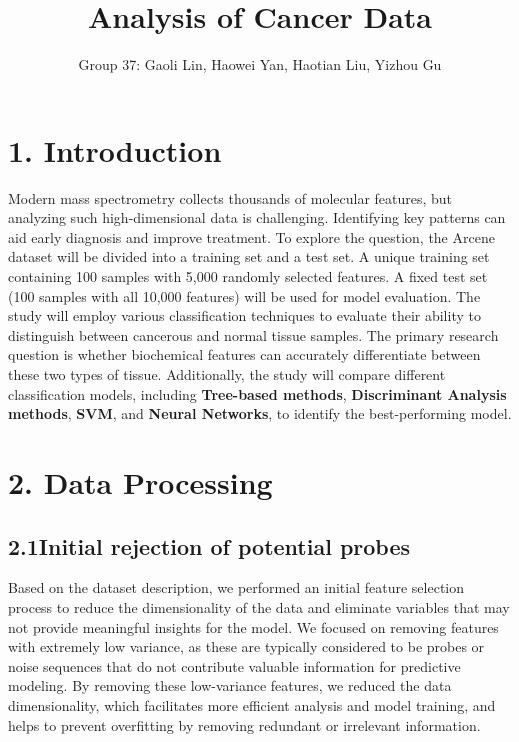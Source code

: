 \documentclass[
  12pt,
  letterpaper,
  DIV=11,
  numbers=noendperiod]{scrartcl}
\title{Analysis of Cancer Data}
\author{Group 37: Gaoli Lin, Haowei Yan, Haotian Liu, Yizhou Gu}
\date{}
\begin{document}
\maketitle


\section{1. Introduction}\label{introduction}

Modern mass spectrometry collects thousands of molecular features, but
analyzing such high-dimensional data is challenging. Identifying key
patterns can aid early diagnosis and improve treatment. To explore the
question, the Arcene dataset will be divided into a training set and a
test set. A unique training set containing 100 samples with 5,000
randomly selected features. A fixed test set (100 samples with all
10,000 features) will be used for model evaluation. The study will
employ various classification techniques to evaluate their ability to
distinguish between cancerous and normal tissue samples. The primary
research question is whether biochemical features can accurately
differentiate between these two types of tissue. Additionally, the study
will compare different classification models, including
\textbf{Tree-based methods}, \textbf{Discriminant Analysis methods},
\textbf{SVM}, and \textbf{Neural Networks}, to identify the
best-performing model.

\section{2. Data Processing}\label{data-processing}

\subsection{2.1Initial rejection of potential
probes}\label{initial-rejection-of-potential-probes}

Based on the dataset description, we performed an initial feature
selection process to reduce the dimensionality of the data and eliminate
variables that may not provide meaningful insights for the model. We
focused on removing features with extremely low variance, as these are
typically considered to be probes or noise sequences that do not
contribute valuable information for predictive modeling. By removing
these low-variance features, we reduced the data dimensionality, which
facilitates more efficient analysis and model training, and helps to
prevent overfitting by removing redundant or irrelevant information.
\end{document}
